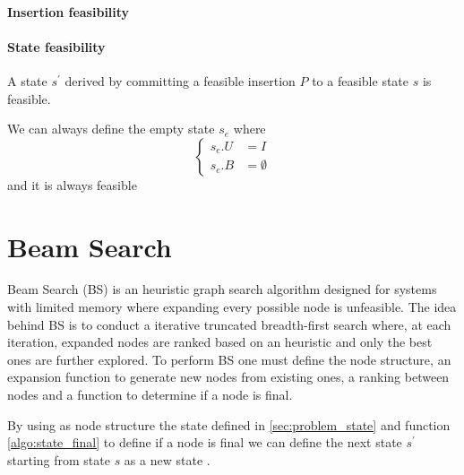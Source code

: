 

\paragraph*{Insertion feasibility}

\paragraph*{State feasibility}

\begin{proposition}
    A state $s^\prime$ derived by committing a feasible insertion $P$ to a feasible state $s$ is feasible.
\end{proposition}

\begin{observation}
    \label{def:empty_state}
    We can always define the empty state $s_e$ where \begin{equation*}
        \left\{ 
            \begin{aligned}
            s_e.U & = I \\
            s_e.B & = \emptyset
            \end{aligned}
        \right.
    \end{equation*}
    and it is always feasible
\end{observation}

\section{Beam Search}
\label{sec:beamsearch}%
Beam Search (BS) %
is an heuristic graph search algorithm designed for systems with limited memory where expanding every possible node is unfeasible.
The idea behind BS is to conduct a iterative truncated breadth-first search where, at each iteration, expanded nodes are ranked based on an heuristic and only the best ones are further explored.
To perform BS one must define the node structure, an expansion function to generate new nodes from existing ones, a ranking between nodes and a function to determine if a node is final.

By using as node structure the state defined in \ref{sec:problem_state} and function \ref{algo:state_final} to define if a node is final we can define the next state $s^\prime$ starting from state $s$ as a new state .


